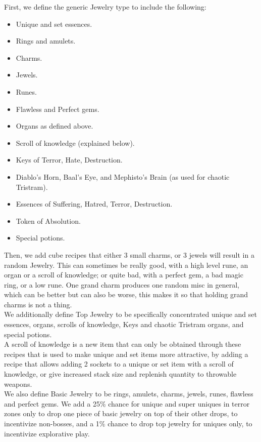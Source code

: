 \documentclass[12pt,a4paper]{article}
\begin{document}
First, we define the generic Jewelry type to include the following:

\begin{itemize}
\item Unique and set essences.
\item Rings and amulets.
\item Charms.
\item Jewels.
\item Runes.
\item Flawless and Perfect gems.
\item Organs as defined above.
\item Scroll of knowledge (explained below).
\item Keys of Terror, Hate, Destruction.
\item Diablo's Horn, Baal's Eye, and Mephisto's Brain (as used for chaotic Tristram).
\item Essences of Suffering, Hatred, Terror, Destruction.
\item Token of Absolution.
\item Special potions.
\end{itemize}

Then, we add cube recipes that either 3 small charms, or 3 jewels will result in a random Jewelry. This can sometimes be really good, with a high level rune, an organ or a scroll of knowledge; or quite bad, with a perfect gem, a bad magic ring, or a low rune. One grand charm produces one random misc in general, which can be better but can also be worse, this makes it so that holding grand charms is not a thing.\\

We additionally define Top Jewelry to be specifically concentrated unique and set essences, organs, scrolls of knowledge, Keys and chaotic Tristram organs, and special potions.\\

A scroll of knowledge is a new item that can only be obtained through these recipes that is used to make unique and set items more attractive, by adding a recipe that allows adding 2 sockets to a unique or set item with a scroll of knowledge, or give increased stack size and replenish quantity to throwable weapons.\\

We also define Basic Jewelry to be rings, amulets, charms, jewels, runes, flawless and perfect gems. We add a 25\% chance for unique and super uniques in terror zones only to drop one piece of basic jewelry on top of their other drops, to incentivize non-bosses, and a 1\% chance to drop top jewelry for uniques only, to incentivize explorative play.\\
\end{document}
